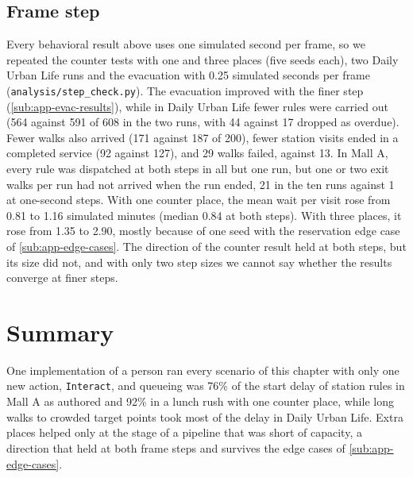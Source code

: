 \subsection{Frame step}
\label{sub:app-step}

Every behavioral result above uses one simulated second per frame, so we repeated the counter tests with one and three places (five seeds each), two Daily Urban Life runs and the evacuation with 0.25 simulated seconds per frame (\texttt{analysis/step\_check.py}). The evacuation improved with the finer step (\cref{sub:app-evac-results}), while in Daily Urban Life fewer rules were carried out (564 against 591 of 608 in the two runs, with 44 against 17 dropped as overdue). Fewer walks also arrived (171 against 187 of 200), fewer station visits ended in a completed service (92 against 127), and 29 walks failed, against 13. In Mall A, every rule was dispatched at both steps in all but one run, but one or two exit walks per run had not arrived when the run ended, 21 in the ten runs against 1 at one-second steps. With one counter place, the mean wait per visit rose from 0.81 to 1.16 simulated minutes (median 0.84 at both steps). With three places, it rose from 1.35 to 2.90, mostly because of one seed with the reservation edge case of \cref{sub:app-edge-cases}. The direction of the counter result held at both steps, but its size did not, and with only two step sizes we cannot say whether the results converge at finer steps.

\section{Summary}
\label{sec:app-summary}

One implementation of a person ran every scenario of this chapter with only one new action, \texttt{Interact}, and queueing was 76\% of the start delay of station rules in Mall A as authored and 92\% in a lunch rush with one counter place, while long walks to crowded target points took most of the delay in Daily Urban Life. Extra places helped only at the stage of a pipeline that was short of capacity, a direction that held at both frame steps and survives the edge cases of \cref{sub:app-edge-cases}.
